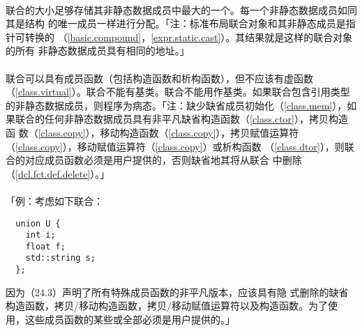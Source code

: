 \paragraph{}
联合的大小足够存储其非静态数据成员中最大的一个。每一个非静态数据成员如同其是结构
的唯一成员一样进行分配。「注：标准布局联合对象和其非静态成员是指针可转换的
（\ref{basic.compound}，\ref{expr.static.cast}）。其结果就是这样的联合对象的所有
非静态数据成员具有相同的地址。」

\paragraph{}
联合可以具有成员函数（包括构造函数和析构函数），但不应该有虚函数
（\ref{class.virtual}）。联合不能有基类。联合不能用作基类。如果联合包含引用类型
的非静态数据成员，则程序为病态。「注：缺少缺省成员初始化（\ref{class.mem}），如
果联合的任何非静态数据成员具有非平凡缺省构造函数（\ref{class.ctor}），拷贝构造函
数（\ref{class.copy}），移动构造函数（\ref{class.copy}），拷贝赋值运算符
（\ref{class.copy}），移动赋值运算符（\ref{class.copy}）或析构函数
（\ref{class.dtor}），则联合的对应成员函数必须是用户提供的，否则缺省地其将从联合
中删除（\ref{dcl.fct.def.delete}）。」

\paragraph{}
「例：考虑如下联合：
\begin{lstlisting}
  union U {
    int i;
    float f;
    std::string s;
  };
\end{lstlisting}
因为（24.3）声明了所有特殊成员函数的非平凡版本，应该具有隐
式删除的缺省构造函数，拷贝/移动构造函数，拷贝/移动赋值运算符以及构造函数。为了使
用，这些成员函数的某些或全部必须是用户提供的。」

